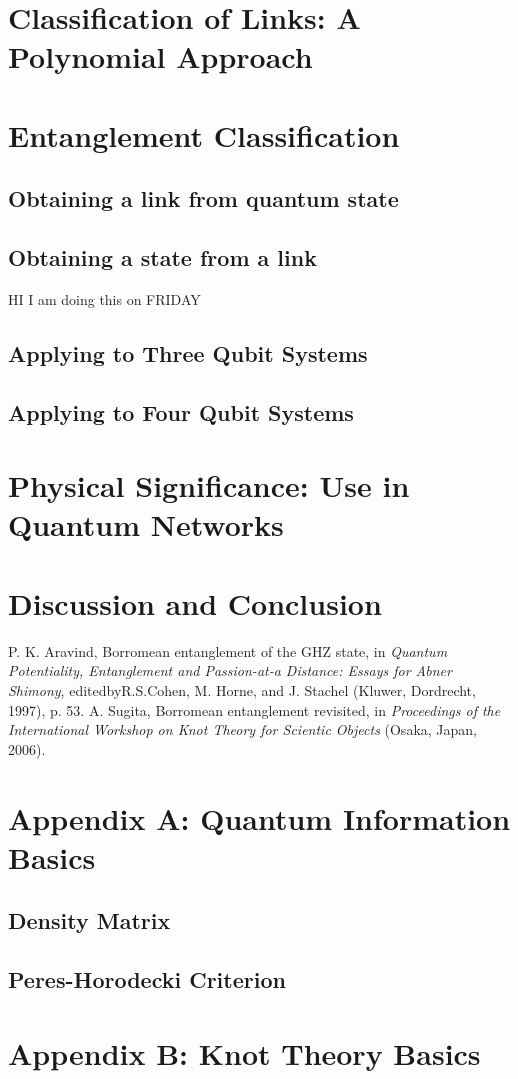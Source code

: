 \documentclass{scrartcl}
\begin{document}
\section{Classification of Links: A Polynomial Approach}
\section{Entanglement Classification}
\subsection{Obtaining a link from quantum state}
\subsection{Obtaining a state from a link}

HI  I am doing this on FRIDAY 


\subsection{Applying to Three Qubit Systems}
\subsection{Applying to Four Qubit Systems}
\section{Physical Significance: Use in Quantum Networks}
\section{Discussion and Conclusion}
\begin{thebibliography}{99}

    P. K. Aravind, Borromean entanglement of the GHZ state,
     in \emph{Quantum Potentiality, Entanglement and Passion-at-a
    Distance: Essays for Abner Shimony}, editedbyR.S.Cohen,
     M. Horne, and J. Stachel (Kluwer, Dordrecht, 1997), p. 53.
    A. Sugita, Borromean entanglement revisited, in \emph{Proceedings of
     the International Workshop on Knot Theory for Scientic Objects}
     (Osaka, Japan, 2006).
    
    \end{thebibliography}
\newpage
\section*{Appendix A: {\huge Quantum Information Basics}}
\subsection{Density Matrix}
\subsection{Peres-Horodecki Criterion}
\newpage
\section*{Appendix B: {\huge Knot Theory Basics}}
\end{document}
